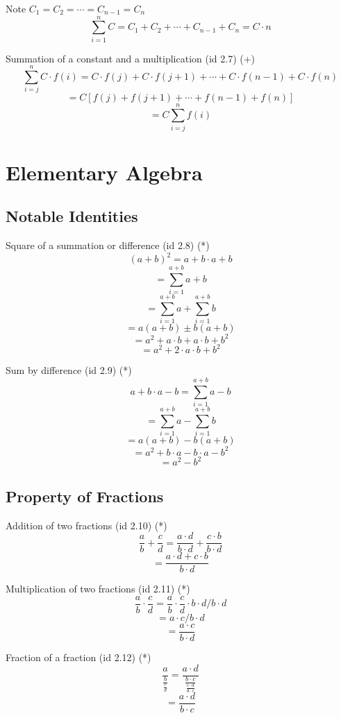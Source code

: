 \documentclass{book}
\begin{document}
                    Note $C_1 = C_2 = \cdots = C_{n - 1} = C_n$
                    \[\sum^n_{i=1} C = C_1 + C_2 + \cdots + C_{n - 1} + C_n = C \cdot n\]

                    Summation of a constant and a multiplication (id 2.7) (+)
                    \[\sum^n_{i=j} C \cdot f(i) = C \cdot f(j) + C \cdot f(j + 1) + \cdots + C \cdot f(n - 1) + C \cdot f(n)\]
                    \[= C [f(j) + f(j + 1) + \cdots + f(n - 1) + f(n)]\]
                    \[= C \sum^n_{i=j} f(i)\]

        \section{Elementary Algebra}
            \subsection{Notable Identities}
                Square of a summation or difference (id 2.8) (*)
                    \[(a + b)^2 = a + b \cdot a + b\]
                    \[= \sum^{a + b}_{i=1} a + b\]
                    \[= \sum^{a + b}_{i=1} a + \sum^{a + b}_{i=1} b\]
                    \[= a(a + b) \pm b(a + b)\]
                    \[= a^2 + a \cdot b + a \cdot b + b^2\]
                    \[= a^2 + 2 \cdot a \cdot b + b^2\]
    
                Sum by difference (id 2.9) (*)
                    \[a + b \cdot a - b = \sum^{a + b}_{i=1} a - b\]
                    \[= \sum^{a + b}_{i=1} a - \sum^{a + b}_{i=1} b\]
                    \[= a(a + b) - b(a + b)\]
                    \[= a^2 + b \cdot a - b \cdot a - b^2\]
                    \[= a^2 - b^2\]

            \subsection{Property of Fractions}

                Addition of two fractions (id 2.10) (*)
                \[\frac{a}{b} + \frac{c}{d} = \frac{a \cdot d}{b \cdot d} + \frac{c \cdot b}{b \cdot d}\]
                \[= \frac{a \cdot d + c \cdot b}{b \cdot d}\]

                Multiplication of two fractions (id 2.11) (*)
                \[\frac{a}{b} \cdot \frac{c}{d} = \frac{a}{b} \cdot \frac{c}{d} \cdot b \cdot d / b \cdot d\]
                \[= a \cdot c / b \cdot d\]
                \[= \frac{a \cdot c}{b \cdot d}\]

                Fraction of a fraction (id 2.12) (*)
                \[\frac{a}{\frac{b}{\frac{c}{d}}} = \frac{a \cdot d}{\frac{b \cdot c}{\frac{c \cdot d}{d \cdot c}}}\]
                \[= \frac{a \cdot d}{b \cdot c}\]
\end{document}
